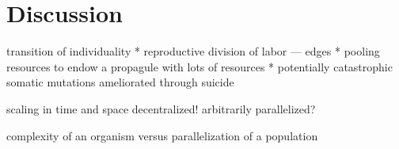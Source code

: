 \section{Discussion}

transition of individuality
  * reproductive division of labor --- edges
  * pooling resources to endow a propagule with lots of resources
  * potentially catastrophic somatic mutations ameliorated through suicide

scaling in time and space
decentralized! arbitrarily parallelized?

complexity of an organism versus parallelization of a population
